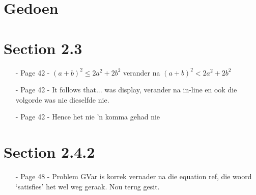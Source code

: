 \documentclass[a4paper,10pt]{article}
\begin{document}
\section*{Gedoen}

\section{Section 2.3}
\begin{itemize}
    \item[-] Page 42 - $(a+b)^2 \leq 2a^2 +2b^2$ verander na $(a+b)^2 < 2a^2 + 2b^2$
    \item[-] Page 42 - It follows that... was display, verander na in-line en ook die volgorde was nie dieselfde nie.
    \item[-] Page 42 - Hence het nie 'n komma gehad nie
\end{itemize}

\section{Section 2.4.2}
\begin{itemize}
    \item[-] Page 48 - Problem GVar is korrek vernader na die equation ref, die woord `satisfies' het wel weg geraak. Nou terug gesit.
\end{itemize}
\end{document}
